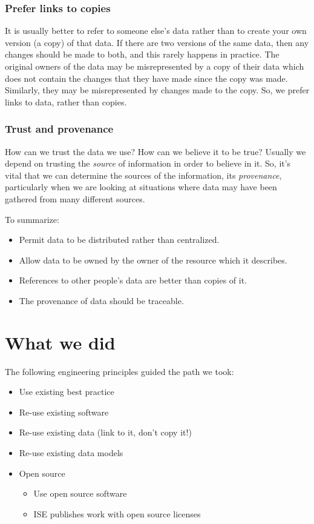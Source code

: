 \documentclass[11pt,twoside,a4paper]{article}
\begin{document}
\subsubsection{Prefer links to copies}
It is usually better to refer to someone else's data rather than to create your own version (a copy) of that data.
If there are two versions of the same data, then any changes should be made to both, and this rarely happens in practice.
The original owners of the data may be misrepresented by a copy of their data which does not contain the changes that they have made since the copy was made.
Similarly, they may be misrepresented by changes made to the copy.
So, we prefer links to data, rather than copies.

\subsubsection{Trust and provenance}
How can we trust the data we use? How can we believe it to be true?
Usually we depend on trusting the \textit{source} of information in order to believe in it.
So, it's vital that we can determine the sources of the information,
its \textit{provenance},
particularly when we are looking at situations where data may have been gathered from many different sources.

To summarize:
\begin{itemize}
  \item Permit data to be distributed rather than centralized.
  \item Allow data to be owned by the owner of the resource which it describes.
  \item References to other people's data are better than copies of it.
  \item The provenance of data should be traceable.  
\end{itemize}

\section{What we did}
The following engineering principles guided the path we took:
  \begin{itemize}
    \item Use existing best practice
    \item Re-use existing software
    \item Re-use existing data (link to it, don't copy it!)
    \item Re-use existing data models
    \item Open source
      \begin{itemize}
	\item Use open source software
	\item ISE publishes work with open source licenses
      \end{itemize}
  \end{itemize}
\end{document}
